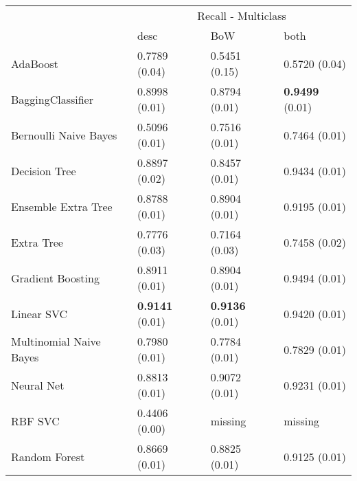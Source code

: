 \begin{tabular}{|l|l|l|l| }
\hline
 &  \multicolumn{3}{c|}{ Recall - Multiclass} \\
\cline{2-4} & desc & BoW & both \\ \hline
AdaBoost                & 0.7789 (0.04) & 0.5451 (0.15) & 0.5720 (0.04)\\
BaggingClassifier       & 0.8998 (0.01) & 0.8794 (0.01) & {\bf 0.9499} (0.01)\\
Bernoulli Naive Bayes   & 0.5096 (0.01) & 0.7516 (0.01) & 0.7464 (0.01)\\
Decision Tree           & 0.8897 (0.02) & 0.8457 (0.01) & 0.9434 (0.01)\\
Ensemble Extra Tree     & 0.8788 (0.01) & 0.8904 (0.01) & 0.9195 (0.01)\\
Extra Tree              & 0.7776 (0.03) & 0.7164 (0.03) & 0.7458 (0.02)\\
Gradient Boosting       & 0.8911 (0.01) & 0.8904 (0.01) & 0.9494 (0.01)\\
Linear SVC              & {\bf 0.9141} (0.01) & {\bf 0.9136} (0.01) & 0.9420 (0.01)\\
Multinomial Naive Bayes & 0.7980 (0.01) & 0.7784 (0.01) & 0.7829 (0.01)\\
Neural Net              & 0.8813 (0.01) & 0.9072 (0.01) & 0.9231 (0.01)\\
RBF SVC                 & 0.4406 (0.00) & missing  & missing \\
Random Forest           & 0.8669 (0.01) & 0.8825 (0.01) & 0.9125 (0.01)\\
\hline
\end{tabular}